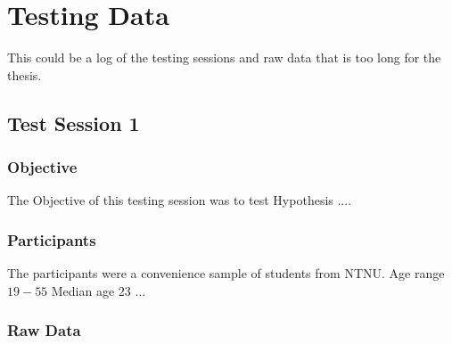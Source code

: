 \chapter{Testing Data}
This could be a log of the testing sessions and raw data that is too long for the thesis.
\section{Test Session 1}
\subsection*{Objective}
The Objective of this testing session was to test Hypothesis ....

\subsection*{Participants}
The participants were a convenience sample of students from NTNU. Age range $19-55$ Median age $23$ ...

\subsection{Raw Data}




